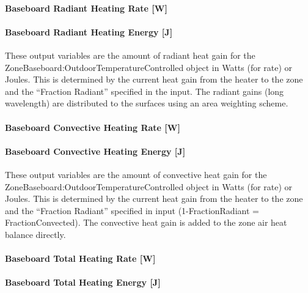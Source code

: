 \paragraph{Baseboard Radiant Heating Rate {[}W{]}}\label{baseboard-radiant-heating-rate-w}

\paragraph{Baseboard Radiant Heating Energy {[}J{]}}\label{baseboard-radiant-heating-energy-j}

These output variables are the amount of radiant heat gain for the Zone\-Baseboard:\-Outdoor\-Temperature\-Controlled object in Watts (for rate) or Joules. This is determined by the current heat gain from the heater to the zone and the ``Fraction Radiant'' specified in the input. The radiant gains (long wavelength) are distributed to the surfaces using an area weighting scheme.

\paragraph{Baseboard Convective Heating Rate {[}W{]}}\label{baseboard-convective-heating-rate-w}

\paragraph{Baseboard Convective Heating Energy {[}J{]}}\label{baseboard-convective-heating-energy-j}

These output variables are the amount of convective heat gain for the Zone\-Baseboard:\-Outdoor\-Temperature\-Controlled object in Watts (for rate) or Joules. This is determined by the current heat gain from the heater to the zone and the ``Fraction Radiant'' specified in input (1-FractionRadiant = FractionConvected). The convective heat gain is added to the zone air heat balance directly.

\paragraph{Baseboard Total Heating Rate {[}W{]}}\label{baseboard-total-heating-rate-w}

\paragraph{Baseboard Total Heating Energy {[}J{]}}\label{baseboard-total-heating-energy-j}


